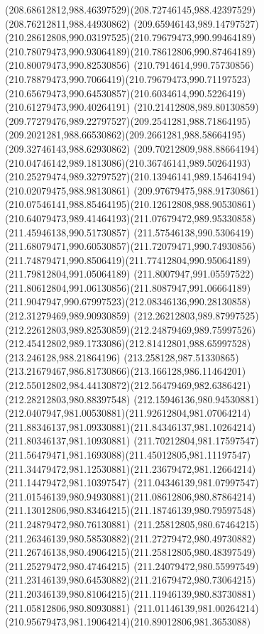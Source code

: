 {{\curveto(208.68612812,988.46397529)(208.72746145,988.42397529)(208.76212811,988.44930862)
\curveto(209.65946143,989.14797527)(210.28612808,990.03197525)(210.79679473,990.99464189)
\curveto(210.78079473,990.93064189)(210.78612806,990.87464189)(210.80079473,990.82530856)
\curveto(210.7914614,990.75730856)(210.78879473,990.7066419)(210.79679473,990.71197523)
\curveto(210.65679473,990.64530857)(210.6034614,990.5226419)(210.61279473,990.40264191)
\curveto(210.21412808,989.80130859)(209.77279476,989.22797527)(209.2541281,988.71864195)
\curveto(209.2021281,988.66530862)(209.2661281,988.58664195)(209.32746143,988.62930862)
\curveto(209.70212809,988.88664194)(210.04746142,989.1813086)(210.36746141,989.50264193)
\curveto(210.25279474,989.32797527)(210.13946141,989.15464194)(210.02079475,988.98130861)
\curveto(209.97679475,988.91730861)(210.07546141,988.85464195)(210.12612808,988.90530861)
\curveto(210.64079473,989.41464193)(211.07679472,989.95330858)(211.45946138,990.51730857)
\curveto(211.57546138,990.5306419)(211.68079471,990.60530857)(211.72079471,990.74930856)
\curveto(211.74879471,990.8506419)(211.77412804,990.95064189)(211.79812804,991.05064189)
\curveto(211.8007947,991.05597522)(211.80612804,991.06130856)(211.8087947,991.06664189)
\curveto(211.9047947,990.67997523)(212.08346136,990.28130858)(212.31279469,989.90930859)
\curveto(212.26212803,989.87997525)(212.22612803,989.82530859)(212.24879469,989.75997526)
\curveto(212.45412802,989.1733086)(212.81412801,988.65997528)(213.246128,988.21864196)
\curveto(213.258128,987.51330865)(213.21679467,986.81730866)(213.166128,986.11464201)
\curveto(212.55012802,984.44130872)(212.56479469,982.6386421)(212.28212803,980.88397548)
\curveto(212.15946136,980.94530881)(212.0407947,981.00530881)(211.92612804,981.07064214)
\curveto(211.88346137,981.09330881)(211.84346137,981.10264214)(211.80346137,981.10930881)
\curveto(211.70212804,981.17597547)(211.56479471,981.1693088)(211.45012805,981.11197547)
\curveto(211.34479472,981.12530881)(211.23679472,981.12664214)(211.14479472,981.10397547)
\curveto(211.04346139,981.07997547)(211.01546139,980.94930881)(211.08612806,980.87864214)
\curveto(211.13012806,980.83464215)(211.18746139,980.79597548)(211.24879472,980.76130881)
\curveto(211.25812805,980.67464215)(211.26346139,980.58530882)(211.27279472,980.49730882)
\curveto(211.26746138,980.49064215)(211.25812805,980.48397549)(211.25279472,980.47464215)
\curveto(211.24079472,980.55997549)(211.23146139,980.64530882)(211.21679472,980.73064215)
\curveto(211.20346139,980.81064215)(211.11946139,980.83730881)(211.05812806,980.80930881)
\curveto(211.01146139,981.00264214)(210.95679473,981.19064214)(210.89012806,981.3653088)
}}
